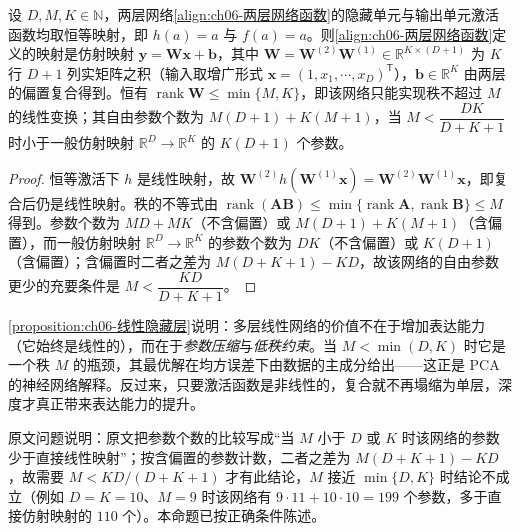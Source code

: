 \documentclass[../../main.tex]{subfiles}
\begin{document}
\begin{proposition}[线性隐藏单元的等价性]\label{proposition:ch06-线性隐藏层}
设 $D,M,K\in\mathbb{N}$，两层网络\eqref{align:ch06-两层网络函数}的隐藏单元与输出单元激活函数均取恒等映射，即 $h(a)=a$ 与 $f(a)=a$。则\eqref{align:ch06-两层网络函数}定义的映射是仿射映射 $\boldsymbol{y}=\boldsymbol{W}\boldsymbol{x}+\boldsymbol{b}$，其中 $\boldsymbol{W}=\boldsymbol{W}^{(2)}\boldsymbol{W}^{(1)}\in\mathbb{R}^{K\times(D+1)}$ 为 $K$ 行 $D+1$ 列实矩阵之积（输入取增广形式 $\boldsymbol{x}=(1,x_{1},\cdots,x_{D})^{\mathsf T}$），$\boldsymbol{b}\in\mathbb{R}^{K}$ 由两层的偏置复合得到。恒有 $\operatorname{rank}\boldsymbol{W}\leqslant\min\{M,K\}$，即该网络只能实现秩不超过 $M$ 的线性变换；其自由参数个数为 $M(D+1)+K(M+1)$，当 $M<\dfrac{DK}{D+K+1}$ 时小于一般仿射映射 $\mathbb{R}^{D}\to\mathbb{R}^{K}$ 的 $K(D+1)$ 个参数。
\end{proposition}

\begin{proof}
恒等激活下 $h$ 是线性映射，故 $\boldsymbol{W}^{(2)}h(\boldsymbol{W}^{(1)}\boldsymbol{x})=\boldsymbol{W}^{(2)}\boldsymbol{W}^{(1)}\boldsymbol{x}$，即复合后仍是线性映射。秩的不等式由 $\operatorname{rank}(\boldsymbol{A}\boldsymbol{B})\leqslant\min\{\operatorname{rank}\boldsymbol{A},\operatorname{rank}\boldsymbol{B}\}\leqslant M$ 得到。参数个数为 $MD+MK$（不含偏置）或 $M(D+1)+K(M+1)$（含偏置），而一般仿射映射 $\mathbb{R}^{D}\to\mathbb{R}^{K}$ 的参数个数为 $DK$（不含偏置）或 $K(D+1)$（含偏置）；含偏置时二者之差为 $M(D+K+1)-KD$，故该网络的自由参数更少的充要条件是 $M<\dfrac{KD}{D+K+1}$。
\end{proof}

\begin{remark}\cref{proposition:ch06-线性隐藏层}说明：多层线性网络的价值不在于增加表达能力（它始终是线性的），而在于\emph{参数压缩}与\emph{低秩约束}。当 $M<\min(D,K)$ 时它是一个秩 $M$ 的瓶颈，其最优解在均方误差下由数据的主成分给出——这正是 PCA 的神经网络解释。反过来，只要激活函数是非线性的，复合就不再塌缩为单层，深度才真正带来表达能力的提升。

原文问题说明：原文把参数个数的比较写成“当 $M$ 小于 $D$ 或 $K$ 时该网络的参数少于直接线性映射”；按含偏置的参数计数，二者之差为 $M(D+K+1)-KD$，故需要 $M<KD/(D+K+1)$ 才有此结论，$M$ 接近 $\min\{D,K\}$ 时结论不成立（例如 $D=K=10$、$M=9$ 时该网络有 $9\cdot 11+10\cdot 10=199$ 个参数，多于直接仿射映射的 $110$ 个）。本命题已按正确条件陈述。
\end{remark}
\end{document}
